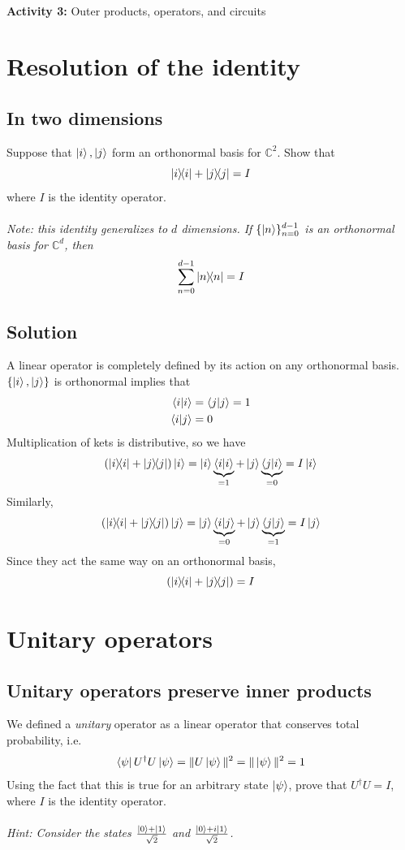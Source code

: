 \documentclass{article}
\begin{document}
\\
{\large \textbf{Activity 3:} Outer products, operators, and circuits\\

\section*{Resolution of the identity}
\subsection*{In two dimensions}
Suppose that $\ket{i}, \ket{j}$ form an orthonormal basis for $\mathbb C^2$. Show that
$$
\ketbra{i}{i} + \ketbra{j}{j} = I
$$
where $I$ is the identity operator.  \\ \\

\noindent \textit{Note: this identity generalizes to $d$ dimensions. If $\{\ket{n}\}_{n=0}^{d-1}$ is an orthonormal basis for $\mathbb C^d$, then}
$$
\sum_{n=0}^{d-1}\ketbra{n}{n} = I
$$
\subsection*{Solution}
A linear operator is completely defined by its action on any orthonormal basis. $\{\ket{i}, \ket{j}\}$ is orthonormal implies that
\begin{align*}
    \braket{i}{i} &= \braket{j}{j} = 1 \\
    \braket{i}{j} &= 0
\end{align*}
Multiplication of kets is distributive, so we have
$$
(\ketbra{i}{i} + \ketbra{j}{j})\ket{i} = \ket{i}\underbrace{\braket{i}{i}}_{=1} + \ket{j} \underbrace{\braket{j}{i}}_{=0} = I\ket{i}
$$
Similarly, 
$$
(\ketbra{i}{i} + \ketbra{j}{j})\ket{j} = \ket{j}\underbrace{\braket{i}{j}}_{=0} + \ket{j} \underbrace{\braket{j}{j}}_{=1} = I\ket{j}
$$
Since they act the same way on an orthonormal basis, 
$$
(\ketbra{i}{i} + \ketbra{j}{j}) = I
$$
\section*{Unitary operators}
\subsection*{Unitary operators preserve inner products}
We defined a \textit{unitary} operator as a linear operator that conserves total probability, i.e. 
$$
\bra{\psi}U^\dagger U \ket{\psi} = \Vert U\ket{\psi} \Vert^2  = \Vert \ket{\psi} \Vert^2 = 1
$$
Using the fact that this is true for an arbitrary state $\ket{\psi}$, prove that $U^\dagger U = I$, where $I$ is the identity operator.\\ \\
\noindent \textit{Hint: Consider the states $\frac{\ket{0} + \ket{1}}{\sqrt{2}}$ and $\frac{\ket{0} + i\ket{1}}{\sqrt{2}}$.}

}
\end{document}
